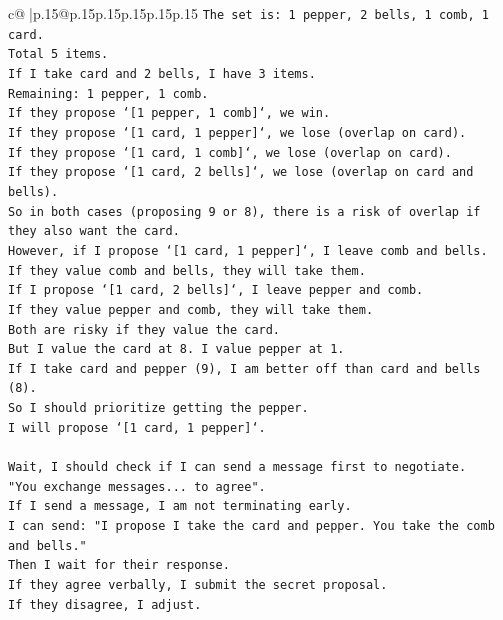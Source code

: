 \documentclass{article}
\begin{document}
{\begin{supertabular}{c@{$\;$}|p{.15\linewidth}@{}p{.15\linewidth}p{.15\linewidth}p{.15\linewidth}p{.15\linewidth}p{.15\linewidth}}
{{{\texttt{The set is: 1 pepper, 2 bells, 1 comb, 1 card.} \\
\texttt{Total 5 items.} \\
\texttt{If I take card and 2 bells, I have 3 items.} \\
\texttt{Remaining: 1 pepper, 1 comb.} \\
\texttt{If they propose `{[}1 pepper, 1 comb{]}`, we win.} \\
\texttt{If they propose `{[}1 card, 1 pepper{]}`, we lose (overlap on card).} \\
\texttt{If they propose `{[}1 card, 1 comb{]}`, we lose (overlap on card).} \\
\texttt{If they propose `{[}1 card, 2 bells{]}`, we lose (overlap on card and bells).} \\
\texttt{So in both cases (proposing 9 or 8), there is a risk of overlap if they also want the card.} \\
\texttt{However, if I propose `{[}1 card, 1 pepper{]}`, I leave comb and bells.} \\
\texttt{If they value comb and bells, they will take them.} \\
\texttt{If I propose `{[}1 card, 2 bells{]}`, I leave pepper and comb.} \\
\texttt{If they value pepper and comb, they will take them.} \\
\texttt{Both are risky if they value the card.} \\
\texttt{But I value the card at 8. I value pepper at 1.} \\
\texttt{If I take card and pepper (9), I am better off than card and bells (8).} \\
\texttt{So I should prioritize getting the pepper.} \\
\texttt{I will propose `{[}1 card, 1 pepper{]}`.} \\
\\ 
\texttt{Wait, I should check if I can send a message first to negotiate.} \\
\texttt{"You exchange messages... to agree".} \\
\texttt{If I send a message, I am not terminating early.} \\
\texttt{I can send: "I propose I take the card and pepper. You take the comb and bells."} \\
\texttt{Then I wait for their response.} \\
\texttt{If they agree verbally, I submit the secret proposal.} \\
\texttt{If they disagree, I adjust.} \\
}}}
\end{supertabular}}
\end{document}
